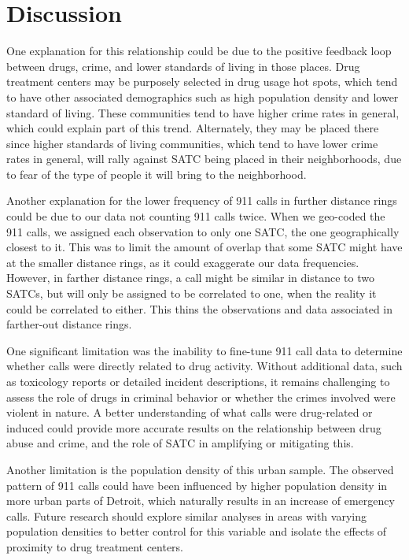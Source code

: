 \documentclass[12pt]{article}
\begin{document}


\section{Discussion}
\label{sec:discussion}

One explanation for this relationship could be due to the positive feedback loop between drugs, crime, and lower standards of living in those places. Drug treatment centers may be purposely selected in drug usage hot spots, which tend to have other associated demographics such as high population density and lower standard of living. These communities tend to have higher crime rates in general, which could explain part of this trend. Alternately, they may be placed there since higher standards of living communities, which tend to have lower crime rates in general, will rally against SATC being placed in their neighborhoods, due to fear of the type of people it will bring to the neighborhood. 
    
Another explanation for the lower frequency of 911 calls in further distance rings could be due to our data not counting 911 calls twice. When we geo-coded the 911 calls, we assigned each observation to only one SATC, the one geographically closest to it. This was to limit the amount of overlap that some SATC might have at the smaller distance rings, as it could exaggerate our data frequencies. However, in farther distance rings, a call might be similar in distance to two SATCs, but will only be assigned to be correlated to one, when the reality it could be correlated to either. This thins the observations and data associated in farther-out distance rings. 

One significant limitation was the inability to fine-tune 911 call data to determine whether calls were directly related to drug activity. Without additional data, such as toxicology reports or detailed incident descriptions, it remains challenging to assess the role of drugs in criminal behavior or whether the crimes involved were violent in nature. A better understanding of what calls were drug-related or induced could provide more accurate results on the relationship between drug abuse and crime, and the role of SATC in amplifying or mitigating this. 
    
Another limitation is the population density of this urban sample. The observed pattern of 911 calls could have been influenced by higher population density in more urban parts of Detroit, which naturally results in an increase of emergency calls. Future research should explore similar analyses in areas with varying population densities to better control for this variable and isolate the effects of proximity to drug treatment centers. 
\end{document}
